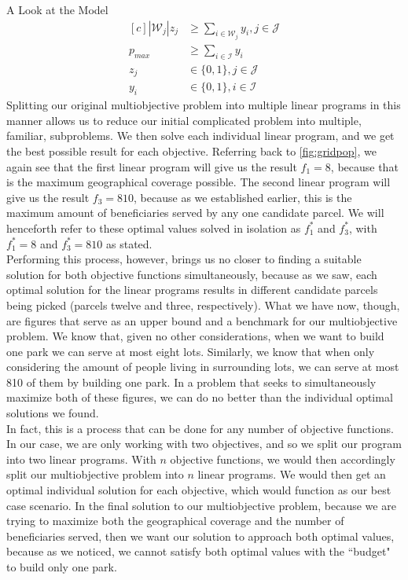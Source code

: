 \documentclass[12pt]{pom_thesis}
\theoremstyle{definition}
\begin{document}
\begin{chapter}{A Look at the Model}
\begin{equation*}
\begin{aligned}[c]
\left|\mathcal{W}_j\right|z_j &\geq \sum_{i \in \mathcal{W}_j} y_i, j \in \mathcal{J} \\
p_{max} &\geq \sum_{i \in \mathcal{I}} y_i  \\
z_j &\in \{0,1\}, j \in \mathcal{J} \\
y_i &\in \{0,1\}, i \in \mathcal{I}
\end{aligned}
\end{equation*}
Splitting our original multiobjective problem into multiple linear programs in this manner allows us to reduce our initial complicated problem into multiple, familiar, subproblems. We then solve each individual linear program, and we get the best possible result for each objective. Referring back to \autoref{fig:gridpop}, we again see that the first linear program will give us the result $f_1 = 8$, because that is the maximum geographical coverage possible. The second linear program will give us the result $f_3 = 810$, because as we established earlier, this is the maximum amount of beneficiaries served by any one candidate parcel. We will henceforth refer to these optimal values solved in isolation as $f_1^*$ and $f_3^*$, with $f_1^* = 8$ and $f_3^* = 810$ as stated. \\

Performing this process, however, brings us no closer to finding a suitable solution for both objective functions simultaneously, because as we saw, each	optimal solution for the linear programs results in different candidate parcels being picked (parcels twelve and three, respectively). What we have now, though, are figures that serve as an upper bound and a benchmark for our multiobjective problem. We know that, given no other considerations, when we want to build one park we can serve at most eight lots. Similarly, we know that when only considering the amount of people living in surrounding lots, we can serve at most 810 of them by building one park. In a problem that seeks to simultaneously maximize both of these figures, we can do no better than the individual optimal solutions we found. \\

In fact, this is a process that can be done for any number of objective functions. In our case, we are only working with two objectives, and so we split our program into two linear programs. With $n$ objective functions, we would then accordingly split our multiobjective problem into $n$ linear programs. We would then get an optimal individual solution for each objective, which would function as our best case scenario. In the final solution to our multiobjective problem, because we are trying to maximize both the geographical coverage and the number of beneficiaries served, then we want our solution to approach both optimal values, because as we noticed, we cannot satisfy both optimal values with the ``budget" to build only one park. \\


\end{chapter}
\end{document}
